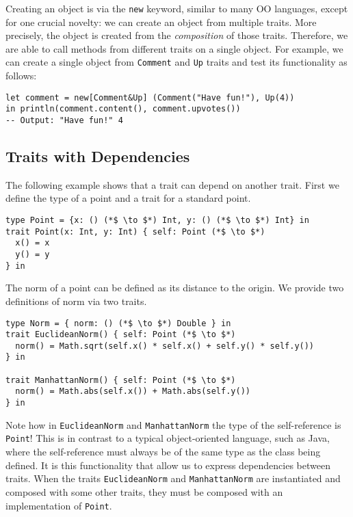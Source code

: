 Creating an object is via the \lstinline$new$ keyword, similar to many OO
languages, except for one crucial novelty: we can create an object from multiple
traits. More precisely, the object is created from the \emph{composition} of
those traits. Therefore, we are able to call methods from different traits on a
single object. For example, we can create a single object from
\lstinline$Comment$  and \lstinline$Up$ traits and test its
functionality as follows:

\begin{lstlisting}
let comment = new[Comment&Up] (Comment("Have fun!"), Up(4))
in println(comment.content(), comment.upvotes())
-- Output: "Have fun!" 4
\end{lstlisting}

\subsection{Traits with Dependencies}
The following example shows that a trait
can depend on another trait. First we define the type of a point and a trait for
a standard point.

\begin{lstlisting}
type Point = {x: () (*$ \to $*) Int, y: () (*$ \to $*) Int} in
trait Point(x: Int, y: Int) { self: Point (*$ \to $*)
  x() = x
  y() = y
} in
\end{lstlisting}

The norm of a point can be defined as its distance to the origin. We provide two
definitions of norm via two traits.

\begin{lstlisting}
type Norm = { norm: () (*$ \to $*) Double } in
trait EuclideanNorm() { self: Point (*$ \to $*)
  norm() = Math.sqrt(self.x() * self.x() + self.y() * self.y())
} in

trait ManhattanNorm() { self: Point (*$ \to $*)
  norm() = Math.abs(self.x()) + Math.abs(self.y())
} in
\end{lstlisting}

Note how in \lstinline$EuclideanNorm$ and \lstinline$ManhattanNorm$
the type of the self-reference is \lstinline$Point$! This is in
contrast to a typical object-oriented language, such as Java, where
the self-reference must always be of the same type as the class being
defined. It is this functionality that allow us to express
dependencies between traits. When the traits \lstinline$EuclideanNorm$
and \lstinline$ManhattanNorm$ are instantiated and composed with some
other traits, they must be composed with an implementation of
\lstinline$Point$.


